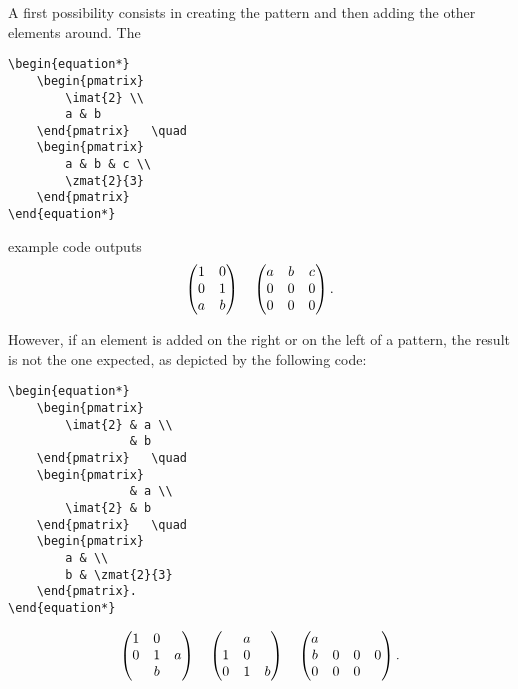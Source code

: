 		
		A first possibility consists in creating the pattern and then adding the other elements around.
		The
\begin{lstlisting}[language={[LaTeX]TeX}]
\begin{equation*}
	\begin{pmatrix}
		\imat{2} \\
		a & b
	\end{pmatrix}	\quad
	\begin{pmatrix}
		a & b & c \\
		\zmat{2}{3}
	\end{pmatrix}
\end{equation*}
\end{lstlisting}
		example code outputs
		\begin{equation*}
			\begin{pmatrix}
				\imat{2} \\
				a & b
			\end{pmatrix}	\quad
			\begin{pmatrix}
				a & b & c \\
				\zmat{2}{3}
			\end{pmatrix}.
		\end{equation*}
		
		However, if an element is added on the right or on the left of a pattern, the result is not the one expected, as depicted by the following code:
\begin{lstlisting}[language={[LaTeX]TeX}]
\begin{equation*}
	\begin{pmatrix}
		\imat{2} & a \\
		         & b
	\end{pmatrix}	\quad
	\begin{pmatrix}
		         & a \\
		\imat{2} & b
	\end{pmatrix}	\quad
	\begin{pmatrix}
		a & \\
		b & \zmat{2}{3}
	\end{pmatrix}.
\end{equation*}
\end{lstlisting}
		\begin{equation*}
			\begin{pmatrix}
				\imat{2} & a \\
				         & b
			\end{pmatrix}	\quad
			\begin{pmatrix}
						 & a \\
				\imat{2} & b
			\end{pmatrix}	\quad
			\begin{pmatrix}
				a & \\
				b & \zmat{2}{3}
			\end{pmatrix}.
		\end{equation*}
		
